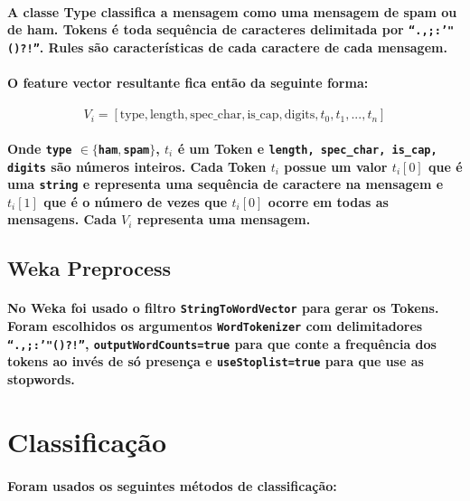 \documentclass[a4paper,10pt]{article}
\theoremstyle{plain}
\begin{document}
\paragraph {
  A classe Type classifica a mensagem como uma mensagem de spam ou de ham. Tokens é toda sequência
  de caracteres delimitada por \texttt{``.,;:'"()?!''}. Rules são características de cada caractere
  de cada mensagem.
}

\paragraph {
  O feature vector resultante fica então da seguinte forma:
}

\begin{equation}
  V_i = [\text{type}, \text{length}, \text{spec\_char}, \text{is\_cap}, \text{digits},
    t_0, t_1, ..., t_n]
\end{equation}

\paragraph{
  Onde \texttt{type} $\in \{$\texttt{ham}$, $\texttt{spam}$\}$, $t_i$ é um Token e \texttt{length,
  spec\_char, is\_cap, digits} são números inteiros. Cada Token $t_i$ possue um valor $t_i[0]$ que
  é uma \texttt{string} e representa uma sequência de caractere na mensagem e $t_i[1]$ que é o
  número de vezes que $t_i[0]$ ocorre em todas as mensagens. Cada $V_i$ representa uma mensagem.
}

\subsection{Weka Preprocess}

\paragraph{
  No Weka foi usado o filtro \texttt{StringToWordVector} para gerar os Tokens. Foram escolhidos os
  argumentos \texttt{WordTokenizer} com delimitadores \texttt{``.,;:'"()?!''},
  \texttt{outputWordCounts=true} para que conte a frequência dos tokens ao invés de só presença e
  \texttt{useStoplist=true} para que use as stopwords.
}

\section{Classificação}

\paragraph{
  Foram usados os seguintes métodos de classificação:
}
\end{document}
